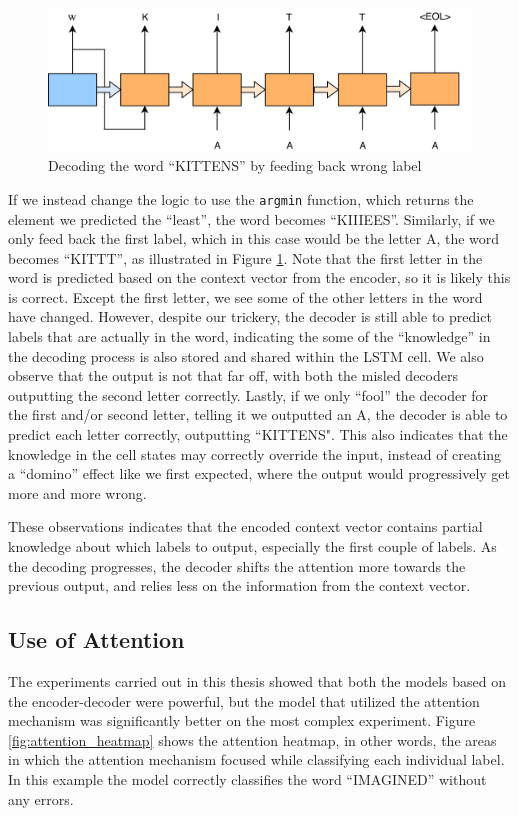 \begin{figure}[!ht]
    \centering
    \includegraphics[width=1\textwidth]{fig/results/kittens_wrong.png}
    \caption{Decoding the word ``KITTENS'' by feeding back wrong label}
    \label{fig:kittens_wrong}
\end{figure}

If we instead change the logic to use the {\tt argmin} function, which returns the element we predicted the ``least'', the word becomes ``KIIIEES''. Similarly, if we only feed back the first label, which in this case would be the letter A, the word becomes ``KITTT'', as illustrated in Figure \ref{fig:kittens_wrong}. Note that the first letter in the word is predicted based on the context vector from the encoder, so it is likely this is correct. Except the first letter, we see some of the other letters in the word have changed. However, despite our trickery, the decoder is still able to predict labels that are actually in the word, indicating the some of the ``knowledge'' in the decoding process is also stored and shared within the LSTM cell. We also observe that the output is not that far off, with both the misled decoders outputting the second letter correctly. Lastly, if we only ``fool'' the decoder for the first and/or second letter, telling it we outputted an A, the decoder is able to predict each letter correctly, outputting ``KITTENS". This also indicates that the knowledge in the cell states may correctly override the input, instead of creating a ``domino'' effect like we first expected, where the output would progressively get more and more wrong.

These observations indicates that the encoded context vector contains partial knowledge about which labels to output, especially the first couple of labels. As the decoding progresses, the decoder shifts the attention more towards the previous output, and relies less on the information from the context vector.

\subsection{Use of Attention}
The experiments carried out in this thesis showed that both the models based on the encoder-decoder were powerful, but the model that utilized the attention mechanism was significantly better on the most complex experiment. Figure \ref{fig:attention_heatmap} shows the attention heatmap, in other words, the areas in which the attention mechanism focused while classifying each individual label. In this example the model correctly classifies the word ``IMAGINED'' without any errors. 

